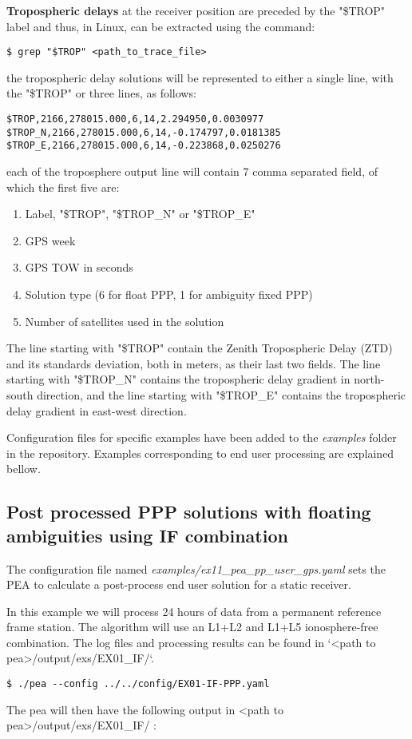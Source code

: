 \textbf{Tropospheric delays} at the receiver position are preceded by the "\$TROP" label and thus, in Linux, can be extracted using the command:
 \begin{verbatim}
$ grep "$TROP" <path_to_trace_file>
\end{verbatim}
the tropospheric delay solutions will be represented to either a single line, with the "\$TROP" or three lines, as follows:
\begin{verbatim}
$TROP,2166,278015.000,6,14,2.294950,0.0030977
$TROP_N,2166,278015.000,6,14,-0.174797,0.0181385
$TROP_E,2166,278015.000,6,14,-0.223868,0.0250276
\end{verbatim}
each of the troposphere output line will contain 7 comma separated field, of which the first five are:
\begin{enumerate}
	\item  Label, "\$TROP", "\$TROP\_N" or "\$TROP\_E"
	\item  GPS week
	\item  GPS TOW in seconds
	\item  Solution type (6 for float PPP, 1 for ambiguity fixed PPP)
	\item  Number of satellites used in the solution
\end{enumerate}
The line starting with "\$TROP" contain the Zenith Tropospheric Delay (ZTD) and its standards deviation, both in meters, as their last two fields.  The line starting with "\$TROP\_N" contains the tropospheric delay gradient in north-south direction, and  the line starting with "\$TROP\_E" contains the tropospheric delay gradient in east-west direction.

Configuration files for specific examples have been added to the \textit{examples} folder in the repository. Examples corresponding to end user processing are explained bellow.

\subsection{Post processed PPP solutions with floating ambiguities using IF combination}
The configuration file named \textit{examples/ex11_pea_pp_user_gps.yaml} sets the PEA to calculate a post-process end user solution for a static receiver. 
 
In this example we will process 24 hours of data from a permanent reference frame station. The algorithm will use an L1+L2 and L1+L5 ionosphere-free combination.
The log files and processing results can be found in `<path to pea>/output/exs/EX01\_IF/`.
\begin{verbatim}
$ ./pea --config ../../config/EX01-IF-PPP.yaml
\end{verbatim}
The pea will then have the following output in <path to pea>/output/exs/EX01\_IF/ :

